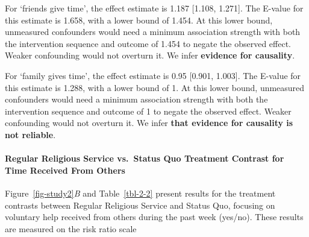 \documentclass[
  single column]{article}
\let\oldparagraph\paragraph
\renewcommand{\paragraph}[1]{\oldparagraph{#1}\mbox{}}
\begin{document}
For `friends give time', the effect estimate is 1.187 {[}1.108,
1.271{]}. The E-value for this estimate is 1.658, with a lower bound of
1.454. At this lower bound, unmeasured confounders would need a minimum
association strength with both the intervention sequence and outcome of
1.454 to negate the observed effect. Weaker confounding would not
overturn it. We infer \textbf{evidence for causality}.

For `family gives time', the effect estimate is 0.95 {[}0.901, 1.003{]}.
The E-value for this estimate is 1.288, with a lower bound of 1. At this
lower bound, unmeasured confounders would need a minimum association
strength with both the intervention sequence and outcome of 1 to negate
the observed effect. Weaker confounding would not overturn it. We infer
\textbf{that evidence for causality is not reliable}.

\paragraph{Regular Religious Service vs.~Status Quo Treatment Contrast
for Time Received From
Others}\label{regular-religious-service-vs.-status-quo-treatment-contrast-for-time-received-from-others}

Figure~\ref{fig-study2}\emph{B} and Table~\ref{tbl-2-2} present results
for the treatment contrasts between Regular Religious Service and Status
Quo, focusing on voluntary help received from others during the past
week (yes/no). These results are measured on the risk ratio scale
\end{document}
